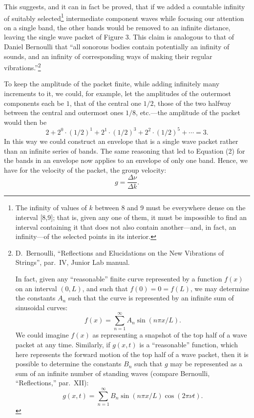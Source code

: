 This suggests, and it can in fact be proved, that if we added a
countable infinity of suitably selected\footnote{The infinity of values
  of $k$ between 8 and 9 must be everywhere dense on the interval
  {[}8,9{]}; that is, given any one of them, it must be impossible to
  find an interval containing it that does not also contain
  another---and, in fact, an infinity---of the selected points in its
  interior.} intermediate component waves while focusing our attention
on a single band, the other bands would be removed to an infinite
distance, leaving the single wave packet of Figure 3. This claim is
analogous to that of Daniel Bernoulli that ``all sonorous bodies contain
potentially an infinity of sounds, and an infinity of corresponding ways
of making their regular vibrations.''\footnote{D.\ Bernoulli, ``Reflections and Elucidations 
on the New Vibrations of Strings'', par.\ IV, Junior Lab manual.

In fact, given any ``reasonable'' finite curve represented by a function
  $f(x)$ on an interval $(0,L)$, and such that $f(0) = 0
  = f(L)$, we may determine the constants
  $A_n$ such that the curve is represented by an
  infinite sum of sinusoidal curves: 
  \begin{equation*}
  f(x) = \sum_{n=1}^{\infty}A_n \sin (n\pi x/L). 
  \end{equation*}
  We could
  imagine $f(x)$ as representing a snapshot of the top half
  of a wave packet at any time. Similarly, if $g(x,t)$ is a
  ``reasonable'' function, which here represents the forward motion of
  the top half of a wave packet, then it is possible to determine the
  constants $B_n$ such that $g$ may be
  represented as a sum of an infinite number of standing waves (compare
  Bernoulli, ``Reflections,'' par.\ XII):
  \begin{equation*}
  g(x,t) = \sum_{n=1}^{\infty} B_n \sin (n\pi x/L) \cos (2\pi\nu t).
  \end{equation*}
  }

To keep the amplitude of the packet finite, while adding infinitely many
increments to it, we could, for example, let the amplitudes of the
outermost components each be $1$, that of the central one $1/2$, those of
the two halfway between the central and outermost ones $1/8$, etc.---the
amplitude of the packet would then be
\begin{equation*}
2 + 2^0\cdot(1/2)^1 + 2^1\cdot(1/2)^3 + 2^2\cdot(1/2)^5 + \cdots = 3.
\end{equation*}
In this way we could construct an envelope that is a single wave packet rather
than an infinite series of bands. The same reasoning that led to Equation (2) for
the bands in an envelope now applies to an envelope of only one band.
Hence, we have for the velocity of the packet, the group velocity:
\begin{equation*}\tag{3}
g = \frac{\Delta\nu}{\Delta k}.
\end{equation*}

